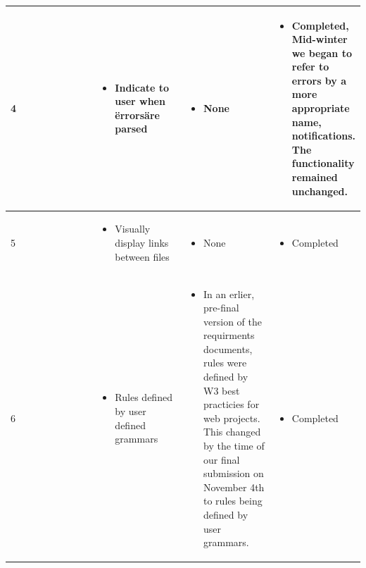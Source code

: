\documentclass[letterpaper,10pt,titlepage,draftclsnofoot,onecolumn,onesided] {IEEEtran}
\begin{document}
{\begin{center}
\begin{singlespace}
\begin{tabular}{ |  p{0.25\linewidth}  |  p{0.25\linewidth}  | p{0.25\linewidth} | p{0.25\linewidth} |}
        \\ \hline

            4
		& 
			\begin{itemize}
				\item Indicate to user when \"errors\" are parsed
			\end{itemize}
		& 
			\begin{itemize}
				\item None
			\end{itemize}
		&
			\begin{itemize}
				\item Completed, Mid-winter we began to refer to errors by a more appropriate name, notifications. 
                The functionality remained unchanged.
			\end{itemize} 
		
        \\ \hline

        	5
		& 
			\begin{itemize}
				\item Visually display links between files
			\end{itemize}
		& 
			\begin{itemize}
				\item None
			\end{itemize}
		&
			\begin{itemize}
				\item Completed
			\end{itemize} 
		
        \\ \hline

        	6
		& 
			\begin{itemize}
				\item Rules defined by user defined grammars
			\end{itemize}
		& 
			\begin{itemize}
				\item In an erlier, pre-final version of the requirments documents, rules were defined by W3 best practicies for web projects.
                This changed by the time of our final submission on November 4th to rules being defined by user grammars.
			\end{itemize}
		&
			\begin{itemize}
				\item Completed
			\end{itemize} 
		
        \\ \hline


\end{tabular}
\end{singlespace}
\end{center}}
\end{document}
